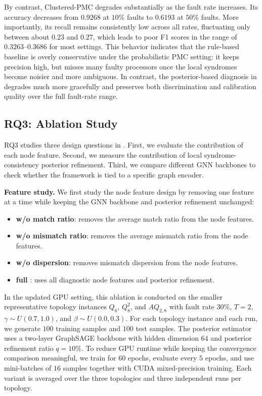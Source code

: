 By contrast, Clustered-PMC degrades substantially as the fault rate increases. Its accuracy decreases from $0.9268$ at $10\%$ faults to $0.6193$ at $50\%$ faults. More importantly, its recall remains consistently low across all rates, fluctuating only between about $0.23$ and $0.27$, which leads to poor F1 scores in the range of $0.3263$--$0.3686$ for most settings. This behavior indicates that the rule-based baseline is overly conservative under the probabilistic PMC setting: it keeps precision high, but misses many faulty processors once the local syndromes become noisier and more ambiguous. In contrast, the posterior-based diagnosis in \tool degrades much more gracefully and preserves both discrimination and calibration quality over the full fault-rate range.

\subsection{RQ3: Ablation Study}
\label{subsec:rq3_ablation}

RQ3 studies three design questions in \tool. First, we evaluate the contribution of each node feature. Second, we measure the contribution of local syndrome-consistency posterior refinement. Third, we compare different GNN backbones to check whether the framework is tied to a specific graph encoder.

\noindent\textbf{Feature study.}
We first study the node feature design by removing one feature at a time while keeping the GNN backbone and posterior refinement unchanged:
\begin{itemize}[leftmargin=*, itemsep=1pt, parsep=0pt, topsep=1pt]
    \item \textbf{w/o match ratio}: removes the average match ratio from the node features.
    \item \textbf{w/o mismatch ratio}: removes the average mismatch ratio from the node features.
    \item \textbf{w/o dispersion}: removes mismatch dispersion from the node features.
    \item \textbf{full \tool}: uses all diagnostic node features and posterior refinement.
\end{itemize}

In the updated GPU setting, this ablation is conducted on the smaller representative topology instances $Q_6$, $Q_8^2$, and $AQ_{2,8}$ with fault rate $30\%$, $T=2$, $\gamma \sim U(0.7, 1.0)$, and $\beta \sim U(0.0, 0.3)$. For each topology instance and each run, we generate $100$ training samples and $100$ test samples. The posterior estimator uses a two-layer GraphSAGE backbone with hidden dimension $64$ and posterior refinement ratio $q=10\%$. To reduce GPU runtime while keeping the convergence comparison meaningful, we train for $60$ epochs, evaluate every $5$ epochs, and use mini-batches of $16$ samples together with CUDA mixed-precision training. Each variant is averaged over the three topologies and three independent runs per topology.

